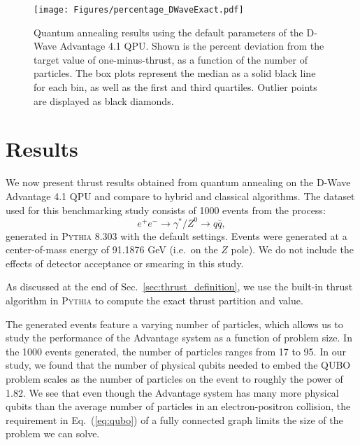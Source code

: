 \documentclass[aps,prd,twocolumn,superscriptaddress,preprintnumbers,nofootinbib,longbibliography,floatfix]{revtex4-1}
\DeclareRobustCommand{\Sec}[1]{Sec.~\ref{sec:#1}}
\DeclareRobustCommand{\Eq}[1]{Eq.~(\ref{eq:#1})}
\begin{document}
\begin{figure*}[t]
    \centering
    \texttt{[image: Figures/percentage\_DWaveExact.pdf]}\\
    \caption{
    Quantum annealing results using the default parameters of the D-Wave Advantage 4.1 QPU.
    Shown is the percent deviation from the target value of one-minus-thrust, as a function of the number of particles.
    The box plots represent the median as a solid black line for each bin, as well as the first and third quartiles.
    Outlier points are displayed as black diamonds.}
    \label{fig:dwavedef}
\end{figure*}


\section{Results}
\label{sec:results}


We now present thrust results obtained from quantum annealing on the D-Wave Advantage 4.1 QPU and compare to hybrid and classical algorithms.
%
The dataset used for this benchmarking study consists of 1000 events from the 
process:
%
\begin{equation}
    e^{+}e^{-}\rightarrow\gamma^{*}/Z^{0}\rightarrow q\bar{q},
\end{equation}
%
generated in \textsc{Pythia} 8.303 with the default settings.
%
Events were generated at a center-of-mass energy of 91.1876 GeV (i.e.\ on the $Z$ pole).
%
We do not include the effects of detector acceptance or smearing in this study.


As discussed at the end of \Sec{thrust_definition}, we use the built-in thrust algorithm in \textsc{Pythia} to compute the exact thrust partition and value.


The generated events feature a varying number of particles, which allows us to study the performance of the Advantage system as a function of problem size.
%
In the 1000 events generated, the number of particles ranges from 17 to 95.
%
In our study, we found that the number of physical qubits needed to embed the QUBO problem scales as the number of particles on the event to roughly the power of 1.82.
%
We see that even though the Advantage system has many more physical qubits than the average number of particles in an electron-positron collision, the requirement in \Eq{qubo} of a fully connected graph limits the size of the problem we can solve.
\end{document}
